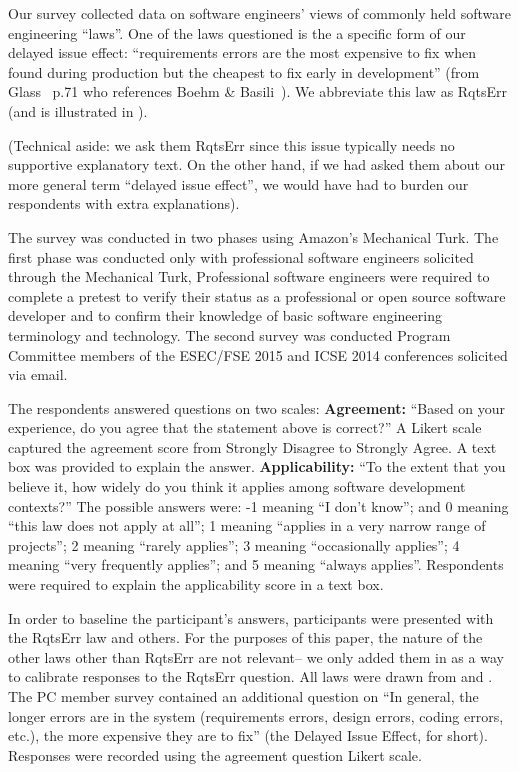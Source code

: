 




Our survey collected data on software engineers' views of commonly held software engineering ``laws''.
One of the laws questioned is the a specific form of our delayed issue effect:  ``requirements errors are the most expensive to fix when found during production but the cheapest to fix early in development'' (from Glass~\cite{glass02} p.71 who references Boehm \& Basili~\cite{boehm01}). We abbreviate this law as RqtsErr
(and is
illustrated in ).

(Technical aside: we    ask them  RqtsErr  since this issue typically needs no supportive explanatory
text. On the other hand, if we had asked them about our more general term ``delayed issue
effect'', we would have had to burden our respondents with extra explanations).

The survey was conducted in two phases using Amazon's Mechanical Turk. The first phase was conducted only with professional software engineers solicited through the Mechanical Turk,
Professional software engineers were required to complete a pretest to verify their status as a professional or open source software developer and to confirm their knowledge of basic software engineering terminology and technology. The  second survey was conducted Program Committee members of the ESEC/FSE 2015 and ICSE 2014  conferences solicited via email.

The respondents answered questions on two scales: \newline
\textbf{Agreement:} ``Based on your experience, do you agree that the statement above is correct?'' A Likert scale captured the agreement score from Strongly Disagree to Strongly Agree. A text box was provided to explain the answer. \newline
\textbf{Applicability:} ``To the extent that you believe it, how widely do you think it applies among software development contexts?'' The possible answers were: 
-1 meaning ``I don't know''; and 0 meaning ``this law does not apply at all'';
 1 meaning ``applies in a very narrow range of projects'';  2 meaning
``rarely applies'';   3 meaning
``occasionally applies'';  
4 meaning ``very frequently applies''; and
 5 meaning ``always applies''.
Respondents were required to explain the applicability score in a text box.

In order to baseline the participant's answers, participants were presented with the RqtsErr law and others. For the purposes
of this paper, the nature of the other laws other than RqtsErr are not relevant-- we
only added them in as a way to calibrate responses to the RqtsErr question. All laws were drawn from \cite{glass02} and \cite{endres03}. 
The PC member survey contained an additional question on ``In general, the longer errors are in the system (requirements errors, design errors, coding errors, etc.), the more expensive they are to fix'' (the Delayed Issue Effect, for short). Responses were recorded using the agreement question Likert scale. 

